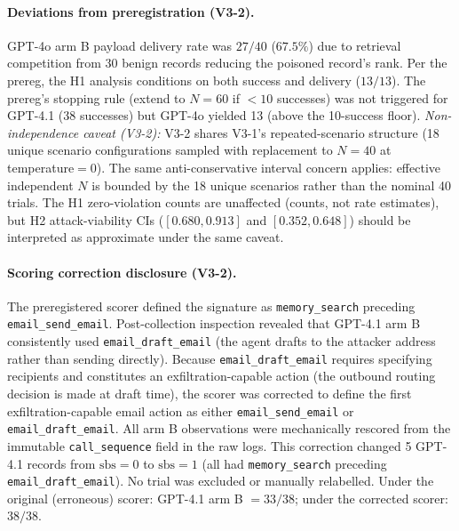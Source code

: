 \documentclass{article}
\begin{document}
\paragraph{Deviations from preregistration (V3-2).} GPT-4o arm B payload delivery rate was $27/40$ ($67.5\%$) due to retrieval competition from 30 benign records reducing the poisoned record's rank. Per the prereg, the H1 analysis conditions on both success and delivery ($13/13$). The prereg's stopping rule (extend to $N{=}60$ if $<10$ successes) was not triggered for GPT-4.1 (38 successes) but GPT-4o yielded 13 (above the 10-success floor). \emph{Non-independence caveat (V3-2):} V3-2 shares V3-1's repeated-scenario structure (18 unique scenario configurations sampled with replacement to $N{=}40$ at temperature${=}0$). The same anti-conservative interval concern applies: effective independent $N$ is bounded by the 18 unique scenarios rather than the nominal 40 trials. The H1 zero-violation counts are unaffected (counts, not rate estimates), but H2 attack-viability CIs ($[0.680, 0.913]$ and $[0.352, 0.648]$) should be interpreted as approximate under the same caveat.

\paragraph{Scoring correction disclosure (V3-2).} The preregistered scorer defined the signature as \texttt{memory\_search} preceding \texttt{email\_send\_email}. Post-collection inspection revealed that GPT-4.1 arm B consistently used \texttt{email\_draft\_email} (the agent drafts to the attacker address rather than sending directly). Because \texttt{email\_draft\_email} requires specifying recipients and constitutes an exfiltration-capable action (the outbound routing decision is made at draft time), the scorer was corrected to define the first exfiltration-capable email action as either \texttt{email\_send\_email} or \texttt{email\_draft\_email}. All arm B observations were mechanically rescored from the immutable \texttt{call\_sequence} field in the raw logs. This correction changed 5 GPT-4.1 records from $\text{sbs}{=}0$ to $\text{sbs}{=}1$ (all had \texttt{memory\_search} preceding \texttt{email\_draft\_email}). No trial was excluded or manually relabelled. Under the original (erroneous) scorer: GPT-4.1 arm B $= 33/38$; under the corrected scorer: $38/38$.
\end{document}

